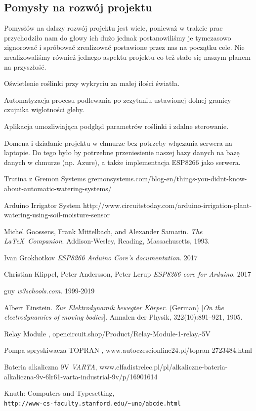 \documentclass[12pt]{article}
\begin{document}
\subsection{Pomysły na rozwój projektu}
Pomysłów na dalszy rozwój projektu jest wiele, ponieważ w trakcie prac przychodziło nam do głowy ich dużo jednak postanowiliśmy je tymczasowo zignorować i spróbować zrealizować postawione przez nas na początku cele. Nie zrealizowaliśmy również jednego aspektu projektu co też stało się naszym planem na przyszłość.

	Oświetlenie roślinki przy wykryciu za małej ilości światła.
	
	Automatyzacja procesu podlewania po zczytaniu ustawionej dolnej granicy czujnika wiglotności gleby.
	
	Aplikacja umozliwiająca podgląd parametrów roślinki i zdalne sterowanie.
	
Domena i działanie projektu w chmurze bez potrzeby włączania serwera na laptopie. Do tego było by potrzebne przeniesienie naszej bazy danych na bazę danych w chmurze (np. Azure), a także implementacja ESP8266 jako serwera.


\newpage
\begin{thebibliography}{9}



 Trutina z Gremon Systems
gremonsystems.com/blog-en/things-you-didnt-know-about-automatic-watering-systems/

 Arduino Irrigator System
http://www.circuitstoday.com/arduino-irrigation-plant-watering-using-soil-moisture-sensor


Michel Goossens, Frank Mittelbach, and Alexander Samarin. 
\textit{The \LaTeX\ Companion}. 
Addison-Wesley, Reading, Massachusetts, 1993.

Ivan Grokhotkov
\textit{ESP8266 Arduino Core’s documentation}. 
2017

Christian Klippel, Peter Andersson, Peter Lerup
\textit{ESP8266 core for Arduino}. 
2017

guy
\textit{w3schools.com}. 
1999-2019
 
Albert Einstein. 
\textit{Zur Elektrodynamik bewegter K{\"o}rper}. (German) 
[\textit{On the electrodynamics of moving bodies}]. 
Annalen der Physik, 322(10):891–921, 1905.

 Relay Module
\emph{},
opencircuit.shop/Product/Relay-Module-1-relay.-5V

 Pompa spryskiwacza TOPRAN
\emph{},
www.autoczescionline24.pl/topran-2723484.html



 Bateria alkaliczna 9V 
\emph{VARTA},
www.elfadistrelec.pl/pl/alkaliczne-bateria-alkaliczna-9v-6lr61-varta-industrial-9v/p/16901614



 
Knuth: Computers and Typesetting,
\\\texttt{http://www-cs-faculty.stanford.edu/\~{}uno/abcde.html}
\end{thebibliography}
\end{document}
